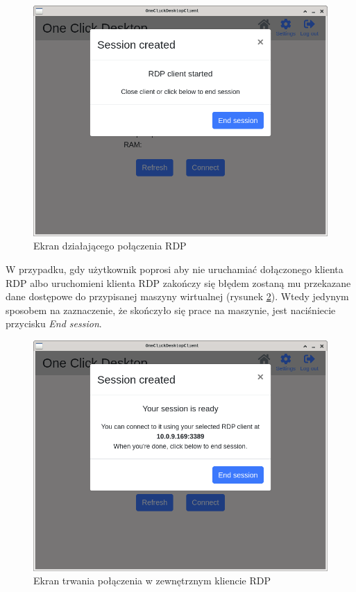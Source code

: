 \documentclass[../opis-rozwiazania.tex]{subfiles}
\begin{document}
\begin{figure}[H]
	\centering
	\includegraphics[width=\textwidth]{resources/client_session.png}
	\caption{Ekran działającego połączenia RDP}
	\label{figure:system_interaction.client.session}
\end{figure}

W przypadku, gdy użytkownik poprosi aby nie uruchamiać dołączonego klienta RDP albo uruchomieni klienta RDP zakończy się błędem zostaną mu przekazane dane dostępowe do przypisanej maszyny wirtualnej (rysunek \ref{figure:system_interaction.client.session_nordp}).
Wtedy jedynym sposobem na zaznaczenie, że skończyło się prace na maszynie, jest naciśniecie przycisku \textit{End session}.

\begin{figure}[H]
	\centering
	\includegraphics[width=\textwidth]{resources/client_session_nordp.png}
	\caption{Ekran trwania połączenia w zewnętrznym kliencie RDP}
	\label{figure:system_interaction.client.session_nordp}
\end{figure}
\end{document}
